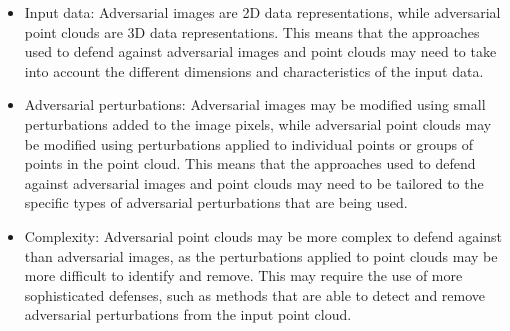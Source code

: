 \documentclass{ieeeaccess}
\begin{document}
\begin{itemize}
    \item Input data: Adversarial images are 2D data representations, while adversarial point clouds are 3D data representations. This means that the approaches used to defend against adversarial images and point clouds may need to take into account the different dimensions and characteristics of the input data.
    \item Adversarial perturbations: Adversarial images may be modified using small perturbations added to the image pixels, while adversarial point clouds may be modified using perturbations applied to individual points or groups of points in the point cloud. This means that the approaches used to defend against adversarial images and point clouds may need to be tailored to the specific types of adversarial perturbations that are being used.
    \item Complexity: Adversarial point clouds may be more complex to defend against than adversarial images, as the perturbations applied to point clouds may be more difficult to identify and remove. This may require the use of more sophisticated defenses, such as methods that are able to detect and remove adversarial perturbations from the input point cloud.
\end{itemize}
\end{document}
